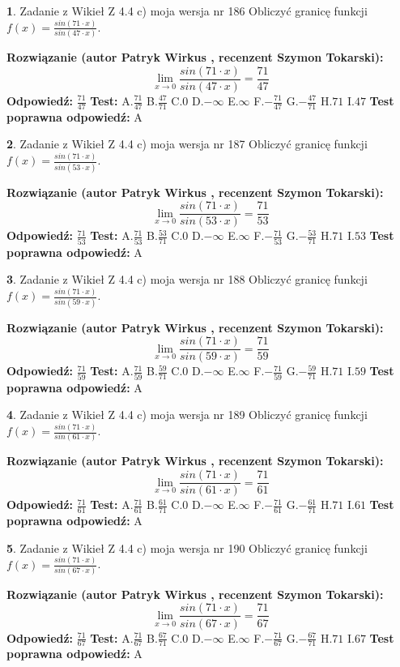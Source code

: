 \documentclass[12pt, a4paper]{article}
\theoremstyle{definition} %
\newtheorem{zad}{}
\newcommand{\zadStart}[1]{\begin{zad}#1\newline}
\newcommand{\zadStop}{\end{zad}}
\newcommand{\rozwStart}[2]{\noindent \textbf{Rozwiązanie (autor #1 , recenzent #2): }\newline}
\newcommand{\rozwStop}{\newline}
\newcommand{\odpStart}{\noindent \textbf{Odpowiedź:}\newline}
\newcommand{\odpStop}{\newline}
\newcommand{\testStart}{\noindent \textbf{Test:}\newline}
\newcommand{\testStop}{\newline}
\newcommand{\kluczStart}{\noindent \textbf{Test poprawna odpowiedź:}\newline}
\newcommand{\kluczStop}{\newline}
\begin{document}
\zadStart{Zadanie z Wikieł Z 4.4 c) moja wersja nr 186}
Obliczyć granicę funkcji $f(x)=\frac{sin(71\cdot x)}{sin(47\cdot x)}$.
\zadStop
\rozwStart{Patryk Wirkus}{Szymon Tokarski}
$$\lim\limits_{x\to 0}\frac{sin(71\cdot x)}{sin(47\cdot x)}=
\frac{71}{47}$$
\rozwStop
\odpStart
$\frac{71}{47}$
\odpStop
\testStart
A.$\frac{71}{47}$
B.$\frac{47}{71}$
C.$0$
D.$-\infty$
E.$\infty$
F.$-\frac{71}{47}$
G.$-\frac{47}{71}$
H.$71$
I.$47$
\testStop
\kluczStart
A
\kluczStop



\zadStart{Zadanie z Wikieł Z 4.4 c) moja wersja nr 187}
Obliczyć granicę funkcji $f(x)=\frac{sin(71\cdot x)}{sin(53\cdot x)}$.
\zadStop
\rozwStart{Patryk Wirkus}{Szymon Tokarski}
$$\lim\limits_{x\to 0}\frac{sin(71\cdot x)}{sin(53\cdot x)}=
\frac{71}{53}$$
\rozwStop
\odpStart
$\frac{71}{53}$
\odpStop
\testStart
A.$\frac{71}{53}$
B.$\frac{53}{71}$
C.$0$
D.$-\infty$
E.$\infty$
F.$-\frac{71}{53}$
G.$-\frac{53}{71}$
H.$71$
I.$53$
\testStop
\kluczStart
A
\kluczStop



\zadStart{Zadanie z Wikieł Z 4.4 c) moja wersja nr 188}
Obliczyć granicę funkcji $f(x)=\frac{sin(71\cdot x)}{sin(59\cdot x)}$.
\zadStop
\rozwStart{Patryk Wirkus}{Szymon Tokarski}
$$\lim\limits_{x\to 0}\frac{sin(71\cdot x)}{sin(59\cdot x)}=
\frac{71}{59}$$
\rozwStop
\odpStart
$\frac{71}{59}$
\odpStop
\testStart
A.$\frac{71}{59}$
B.$\frac{59}{71}$
C.$0$
D.$-\infty$
E.$\infty$
F.$-\frac{71}{59}$
G.$-\frac{59}{71}$
H.$71$
I.$59$
\testStop
\kluczStart
A
\kluczStop



\zadStart{Zadanie z Wikieł Z 4.4 c) moja wersja nr 189}
Obliczyć granicę funkcji $f(x)=\frac{sin(71\cdot x)}{sin(61\cdot x)}$.
\zadStop
\rozwStart{Patryk Wirkus}{Szymon Tokarski}
$$\lim\limits_{x\to 0}\frac{sin(71\cdot x)}{sin(61\cdot x)}=
\frac{71}{61}$$
\rozwStop
\odpStart
$\frac{71}{61}$
\odpStop
\testStart
A.$\frac{71}{61}$
B.$\frac{61}{71}$
C.$0$
D.$-\infty$
E.$\infty$
F.$-\frac{71}{61}$
G.$-\frac{61}{71}$
H.$71$
I.$61$
\testStop
\kluczStart
A
\kluczStop



\zadStart{Zadanie z Wikieł Z 4.4 c) moja wersja nr 190}
Obliczyć granicę funkcji $f(x)=\frac{sin(71\cdot x)}{sin(67\cdot x)}$.
\zadStop
\rozwStart{Patryk Wirkus}{Szymon Tokarski}
$$\lim\limits_{x\to 0}\frac{sin(71\cdot x)}{sin(67\cdot x)}=
\frac{71}{67}$$
\rozwStop
\odpStart
$\frac{71}{67}$
\odpStop
\testStart
A.$\frac{71}{67}$
B.$\frac{67}{71}$
C.$0$
D.$-\infty$
E.$\infty$
F.$-\frac{71}{67}$
G.$-\frac{67}{71}$
H.$71$
I.$67$
\testStop
\kluczStart
A
\kluczStop
\end{document}
